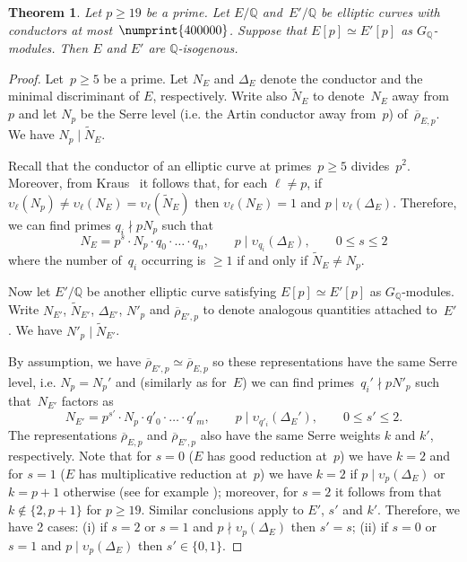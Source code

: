 \documentclass[12pt, reqno]{amsart}
\newcommand{\Q}{\mathbb{Q}}
\newcommand{\rhobar}{{\overline{\rho}}}
\newcommand{\vv}{\upsilon}
\numberwithin{equation}{section}
\newtheorem{theorem}{Theorem}[section]
\theoremstyle{definition}
\theoremstyle{remark}
\begin{document}
\begin{theorem}
 \label{T:cong19}
 Let $p \geq 19$ be a prime. Let $E/\Q$ and~$E'/\Q$ be elliptic curves
 with conductors at most~$\numprint{400000}$.  Suppose that $E[p]
 \simeq E'[p]$ as $G_\Q$-modules. Then $E$ and $E'$ are
 $\Q$-isogenous.
 \end{theorem}
\begin{proof} Let~$p \geq 5$ be a prime. Let $N_E$ and $\Delta_E$ 
denote the conductor and the minimal discriminant of $E$, respectively. Write also $\tilde{N}_E$ to denote~$N_E$ away from~$p$ and let $N_p$ be the Serre level (i.e. the Artin conductor away from~$p$) of~$\rhobar_{E,p}$. 
We have $N_p \mid \tilde{N}_E$.

Recall that the conductor of an elliptic curve at primes~$p \geq 5$ divides~$p^2$. Moreover, from Kraus~\cite[p. 30]{KrausThesis}
it follows that, for each $\ell \neq p$, if 
$\vv_{\ell}(N_p) \neq \vv_{\ell}(N_E) = \vv_{\ell}(\tilde{N}_E)$ then
$\vv_{\ell}(N_E) = 1$ and $p \mid \vv_{\ell}(\Delta_E)$.
Therefore, we can find primes $q_i \nmid pN_p$ such that 
\begin{equation}\label{E:condE}
  N_E = p^s \cdot N_p \cdot q_0 \cdot \ldots \cdot q_n, 
 \qquad p \mid \vv_{q_i}(\Delta_E), \qquad 0 \leq s \leq 2
\end{equation}
where the number of~$q_i$ occurring is $\geq 1$ if and only if 
$\tilde{N}_E \neq N_p$. 

Now let $E'/\Q$ be another elliptic curve satisfying $E[p] \simeq E'[p]$ as $G_\Q$-modules. Write $N_{E'}$, $\tilde{N}_{E'}$, $\Delta_{E'}$, $N'_p$ and $\rhobar_{E',p}$ to denote analogous quantities attached to~$E'$. We have $N'_p \mid \tilde{N}_{E'}$.

By assumption, we have $\rhobar_{E',p} \simeq \rhobar_{E,p}$ so these representations have the same Serre level, i.e. $N_p = N_p'$ and (similarly as for~$E$) we can find primes~$q_i' \nmid pN'_p$ such that~$N_{E'}$ factors as
\begin{equation}\label{E:condE'}
 N_{E'} = p^{s'} \cdot N_p \cdot q'_0 \cdot \ldots \cdot q'_m, 
 \qquad p \mid \vv_{q'_i}(\Delta_E'),
 \qquad 0 \leq s' \leq 2.
\end{equation}
The representations $\rhobar_{E,p}$ and $\rhobar_{E',p}$ also have the same Serre weights $k$ and $k'$, respectively. Note that for $s=0$ ($E$ has good reduction at~$p$) we have $k=2$ and for $s=1$ ($E$ has multiplicative reduction at~$p$) we have $k=2$ if $p \mid \vv_p(\Delta_E)$ or $k=p+1$ otherwise (see for example \cite[p. 3]{KrausThesis}); moreover, for $s=2$ it follows from \cite[Th\'eor\`eme 1]{KrausThesis} that $k \not\in \{2, p+1\}$ 
for $p \geq 19$. Similar conclusions apply to $E'$, $s'$ and $k'$. 
Therefore, we have 2 cases: (i) if $s = 2$ or $s=1$ and $p \nmid \vv_{p}(\Delta_E)$ then $s'=s$; (ii) if $s=0$ or $s=1$ and $p \mid \vv_{p}(\Delta_E)$ then $s' \in \{0,1 \}$.


\end{proof}
\end{document}
